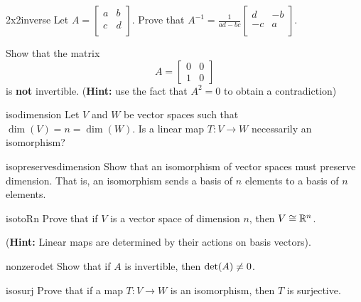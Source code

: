 \begin{problem}{2x2inverse}
    Let $A = 
\begin{bmatrix}
a & b \\
c & d \\
\end{bmatrix}$.  Prove that $A^{-1} = \frac{1}{ad-bc}\begin{bmatrix}
d & -b \\
-c & a \\
\end{bmatrix}$.
\end{problem}

\begin{problem}
    Show that the matrix  \begin{equation*}
A = 
\begin{bmatrix}
0 & 0 \\
1 & 0
\end{bmatrix}
\end{equation*} is \textbf{not} invertible. (\textbf{Hint:} use the fact that $A^2 = 0$ to obtain a contradiction)
\end{problem}


\begin{problem}{isodimension}
    Let $V$ and $W$ be vector spaces such that $\dim(V) = n = \dim(W)$.  Is a linear map $T: V \to W$ necessarily an isomorphism?
\end{problem}

\begin{problem}{isopreservesdimension}
    Show that an isomorphism of vector spaces must preserve dimension.  That is, an isomorphism sends a basis of $n$ elements to a basis of $n$ elements.
\end{problem}

\begin{problem}{isotoRn}
    Prove that if $V$ is a vector space of dimension $n$, then $V \cong \mathbb{R}^n$.  
    
    (\textbf{Hint:} Linear maps are determined by their actions on basis vectors).
\end{problem}

\begin{problem}{nonzerodet}
    Show that if $A$ is invertible, then $\textnormal{det}(A) \neq 0$.
\end{problem}

\begin{problem}{isosurj}
    Prove that if a map $T : V \to W$ is an isomorphism, then $T$ is surjective.
\end{problem}

